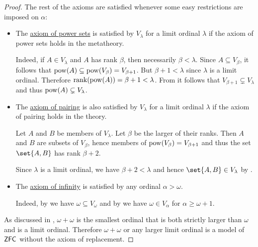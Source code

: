\begin{proof}
  The rest of the axioms are satisfied whenever some easy restrictions are imposed on \( \alpha \):
  \begin{itemize}
    \item The \hyperref[def:zfc/power_set]{axiom of power sets} is satisfied by \( V_\lambda \) for a limit ordinal \( \lambda \) if the axiom of power sets holds in the metatheory.

    Indeed, if \( A \in V_\lambda \) and \( A \) has rank \( \beta \), then necessarily \( \beta < \lambda \). Since \( A \subseteq V_\beta \), it follows that \( \operatorname{pow}(A) \subseteq \operatorname{pow}(V_\beta) = V_{\beta + 1} \). But \( \beta + 1 < \lambda \) since \( \lambda \) is a limit ordinal. Therefore \( \operatorname{rank}(\operatorname{pow}(A)) = \beta + 1 < \lambda \). From  it follows that \( V_{\beta + 1} \subsetneq V_\lambda \) and thus \( \operatorname{pow}(A) \subsetneq V_\lambda \).

    \item The \hyperref[def:zfc/pairing]{axiom of pairing} is also satisfied by \( V_\lambda \) for a limit ordinal \( \lambda \) if the axiom of pairing holds in the theory.

    Let \( A \) and \( B \) be members of \( V_\lambda \). Let \( \beta \) be the larger of their ranks. Then \( A \) and \( B \) are subsets of \( V_\beta \), hence members of \( \operatorname{pow}(V_\beta) = V_{\beta + 1} \) and thus the set \( \set{ A, B } \) has rank \( \beta + 2 \).

    Since \( \lambda \) is a limit ordinal, we have \( \beta + 2 < \lambda \) and hence \( \set{ A, B } \in V_\lambda \) by .

    \item The \hyperref[def:zfc/infinity]{axiom of infinity} is satisfied by any ordinal \( \alpha > \omega \).

    Indeed, by  we have \( \omega \subseteq V_\omega \) and by  we have \( \omega \in V_\alpha \) for \( \alpha \geq \omega + 1 \).
  \end{itemize}

  As discussed in , \( \omega + \omega \) is the smallest ordinal that is both strictly larger than \( \omega \) and is a limit ordinal. Therefore \( \omega + \omega \) or any larger limit ordinal is a model of \( \textsf{ZFC} \) without the axiom of replacement.
\end{proof}

